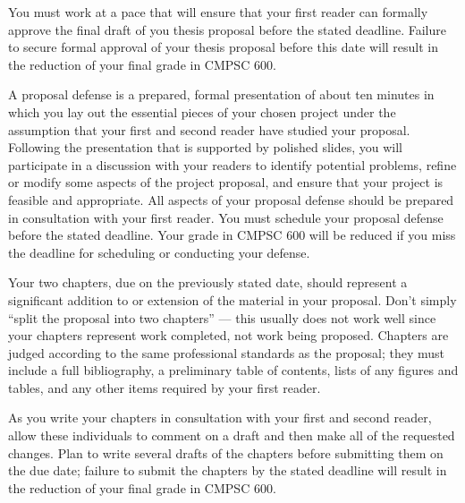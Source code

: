 % 
% 

You must work at a pace that will ensure that your first reader can formally approve the final draft of you thesis
proposal before the stated deadline.  Failure to secure formal approval of your thesis proposal before this date will
result in the reduction of your final grade in CMPSC 600.


\medskip
{}
A proposal defense is a prepared, formal presentation of about ten minutes in which you lay out the essential pieces of
your chosen project under the assumption that your first and second reader have studied your proposal.  Following the
presentation that is supported by polished slides, you will participate in a discussion with your readers to identify
potential problems, refine or modify some aspects of the project proposal, and ensure that your project is feasible
and appropriate. All aspects of your proposal defense should be prepared in consultation with your first reader.
You must schedule your proposal defense before the stated deadline. Your grade in CMPSC 600 will be reduced if you miss the
deadline for scheduling or conducting your defense.

% 
% 

\medskip
{} Your two chapters, due on the previously stated date, should represent a
significant addition to or extension of the material in your proposal. Don't simply ``split the proposal into two
chapters'' --- this usually does not work well since your chapters represent work completed, not work being proposed.
Chapters are judged according to the same professional standards as the proposal; they must include a full bibliography, a 
preliminary table of contents, lists of any figures and tables, and any other items required by your first reader.

As you write your chapters in consultation with your first and second reader, allow these individuals to comment on a
draft and then make all of the requested changes.  Plan to write several drafts of the chapters before submitting them
on the due date; failure to submit the chapters by the stated deadline will result in the reduction of your final grade
in CMPSC 600.

